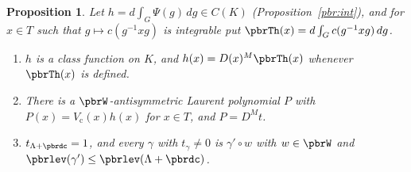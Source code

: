 \documentclass[10pt]{amsart}
\newtheorem{proposition}[theorem]{Proposition}
\theoremstyle{definition}
\theoremstyle{remark}
\begin{document}
\begin{proposition}\label{pbr:laurent}
Let $h=d\int_G\Psi(g)\,dg\in C(K)$ (Proposition~\ref{pbr:int}), and for $x\in T$ such that
$g\mapsto c(g^{-1}xg)$ is integrable put $\pbrTh(x)=d\int_Gc(g^{-1}xg)\,dg$.
\begin{enumerate}
\item[(a)] $h$ is a class function on $K$, and $h(x)=D(x)^M\pbrTh(x)$ whenever $\pbrTh(x)$ is
defined.
\item[(b)] There is a $\pbrW$-antisymmetric Laurent polynomial $P$ with $P(x)=V_{\mathrm c}(x)h(x)$
for $x\in T$, and $P=D^Mt$.
\item[(c)] $t_{\Lambda+\pbrdc}=1$, and every $\gamma$ with $t_\gamma\ne0$ is $\gamma'\circ w$ with
$w\in\pbrW$ and $\pbrlev(\gamma')\le\pbrlev(\Lambda+\pbrdc)$.
\end{enumerate}
\end{proposition}
\end{document}

